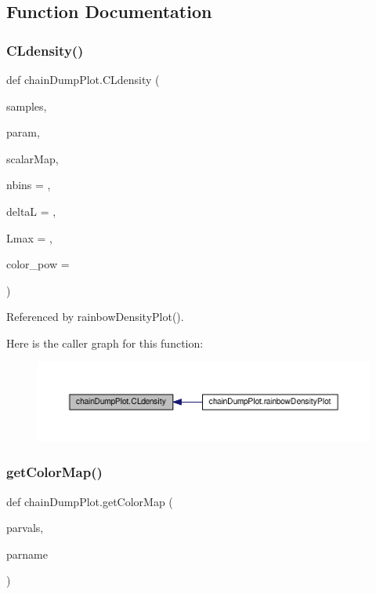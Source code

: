 \subsection{Function Documentation}
\mbox{\label{namespacechainDumpPlot_a0fdd91b93b7b59f54d465fe430839bff}} 
\subsubsection{\texorpdfstring{C\+Ldensity()}{CLdensity()}}
{\footnotesize\ttfamily def chain\+Dump\+Plot.\+C\+Ldensity (\begin{DoxyParamCaption}\item[{}]{samples,  }\item[{}]{param,  }\item[{}]{scalar\+Map,  }\item[{}]{nbins = {},  }\item[{}]{deltaL = {},  }\item[{}]{Lmax = {},  }\item[{}]{color\+\_\+pow = {} }\end{DoxyParamCaption})}



Referenced by rainbow\+Density\+Plot().

Here is the caller graph for this function\+:
\nopagebreak
\begin{figure}[H]
\begin{center}
\leavevmode
\includegraphics[width=350pt]{namespacechainDumpPlot_a0fdd91b93b7b59f54d465fe430839bff_icgraph}
\end{center}
\end{figure}
\mbox{\label{namespacechainDumpPlot_abebc3286beb684f132f59c5e88dd80c3}} 
\subsubsection{\texorpdfstring{get\+Color\+Map()}{getColorMap()}}
{\footnotesize\ttfamily def chain\+Dump\+Plot.\+get\+Color\+Map (\begin{DoxyParamCaption}\item[{}]{parvals,  }\item[{}]{parname }\end{DoxyParamCaption})}



